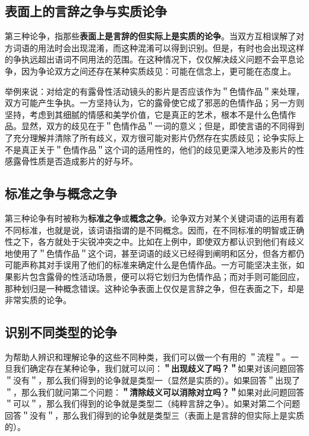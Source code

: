 \subsection{表面上的言辞之争与实质论争}

第三种论争，指那些\textbf{表面上是言辞的但实际上是实质的论争}。当双方互相误解了对方词语的用法时会出现混淆，而这种混淆可以得到识别。但是，有时也会出现这样的争执远超出语词不同用法的范围。在这种情况下，仅仅解决歧义问题不会平息论争，因为争论双方之间还存在某种实质歧见：可能在信念上，更可能在态度上。

举例来说：对给定的有露骨性活动镜头的影片是否应该作为＂色情作品＂来处理，双方可能产生争执。一方坚持认为，它的露骨使它成了邪恶的色情作品；另一方则坚持，考虑到其细腻的情感和美学价值，它是真正的艺术，根本不是什么色情作品。显然，双方的歧见在于＂色情作品＂一词的意义；但是，即使言语的不同得到了充分理解并清除了所有歧义，双方很可能对影片仍然存在实质歧见；论争实际上不是真正关于＂色情作品＂这个词的适用性的，他们的歧见更深入地涉及影片的性感露骨性质是否造成影片的好与坏。

\subsection{标准之争与概念之争}

第三种论争有时被称为\textbf{标准之争}或\textbf{概念之争}。论争双方对某个关键词语的运用有着不同标准，也就是说，该词语指谓的是不同概念。因而，在不同标准的明智或正确性之下，各方就处于尖锐冲突之中。比如在上例中，即使双方都认识到他们有歧义地使用了＂色情作品＂这个词，甚至词语的歧义已经得到阐明和区分，但各方都仍可能声称其对手误用了他们的标准来确定什么是色情作品。一方可能坚决主张，如果影片包含露骨的性活动场景，便可以将它划归为色情作品；而对手则可能回应，那种划归是一种概念错误。这种论争表面上仅仅是言辞之争，但在表面之下，却是非常实质的论争。

\subsection{识别不同类型的论争}

为帮助人辨识和理解论争的这些不同种类，我们可以做一个有用的 ＂流程＂。一旦我们确定存在某种论争，我们就可以问：\textbf{＂出现歧义了吗？＂}如果对该问题回答＂没有＂，那么我们得到的论争就是类型一（显然是实质的）。如果回答＂出现了＂，那么我们就问第二个问题：\textbf{＂清除歧义可以消除对立吗？＂}如果对此问题回答＂可以＂，那么我们得到的论争就是类型二（纯粹言辞之争）。如果对第二个问题回答＂没有＂，那么我们得到的论争就是类型三（表面上是言辞的但实际上是实质的）。

